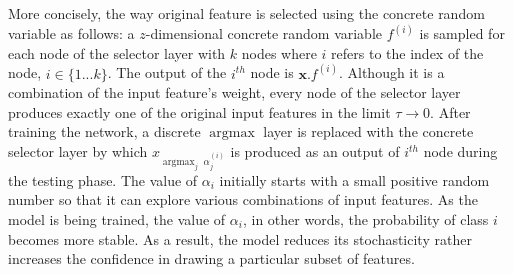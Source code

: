 \documentclass{bioinfo}
\DeclareMathOperator*{\argmax}{argmax}
\begin{document}
More concisely, the way original feature is selected using the concrete random variable as follows: a $z$-dimensional concrete random variable $f^{(i)}$ is sampled for each node of the selector layer with $k$ nodes where $i$ refers to the index of the node, $i \in \{1...k\}$. The output of the $i^{th}$ node is $ \textbf{x}.f^{(i)}$. Although it is a combination of the input feature's weight, every node of the selector layer produces exactly one of the original input features in the limit $\tau \to 0$. After training the network, a discrete $\argmax$ layer is replaced with the concrete selector layer by which $x_{\argmax_j \; \alpha_j^{(i)}}$ is produced as an output of $i^{th}$ node during the testing phase. The value of $\alpha_i$ initially starts with a small positive random number so that it can explore various combinations of input features. As the model is being trained, the value of $\alpha_i$, in other words, the probability of class $i$ becomes more stable. As a result, the model reduces its stochasticity rather increases the confidence in drawing a particular subset of features. 
\end{document}
